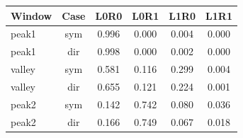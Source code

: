 \begin{tabular}{@{}lccccc@{}}
\toprule
Window & Case & L0R0 & L0R1 & L1R0 & L1R1 \\
\midrule
peak1 & sym & 0.996 & 0.000 & 0.004 & 0.000 \\
peak1 & dir & 0.998 & 0.000 & 0.002 & 0.000 \\
valley & sym & 0.581 & 0.116 & 0.299 & 0.004 \\
valley & dir & 0.655 & 0.121 & 0.224 & 0.001 \\
peak2 & sym & 0.142 & 0.742 & 0.080 & 0.036 \\
peak2 & dir & 0.166 & 0.749 & 0.067 & 0.018 \\
\bottomrule
\end{tabular}
